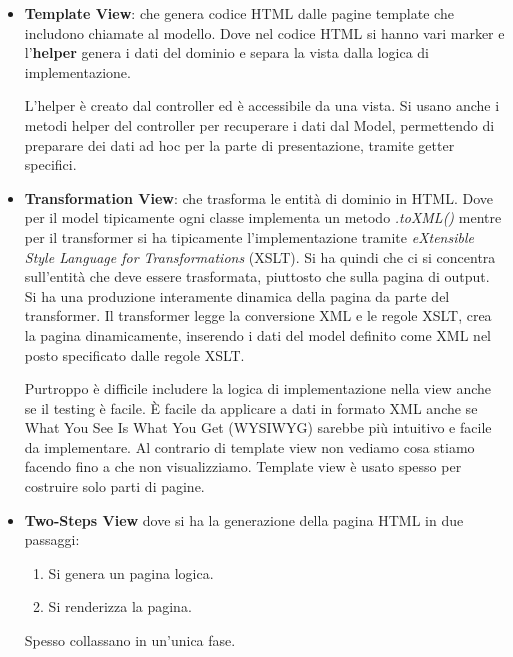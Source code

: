 \begin{itemize}
      \item \textbf{Template View}: che genera codice HTML dalle pagine template
            che includono chiamate al modello. Dove nel codice HTML si hanno vari
            marker e l'\textbf{helper} genera i dati del dominio e separa la vista
            dalla logica di implementazione.

            L'helper è creato dal controller ed è accessibile da una vista. Si
            usano anche i metodi helper del controller per recuperare i dati dal
            Model, permettendo di preparare dei dati ad hoc per la parte di
            presentazione, tramite getter specifici.
      \item \textbf{Transformation View}: che trasforma le entità di dominio in
            HTML. Dove per il model tipicamente ogni classe implementa un metodo
            \textit{.toXML()} mentre per il transformer si ha tipicamente
            l'implementazione tramite \textit{eXtensible Style Language for
                  Transformations} (XSLT). Si ha quindi che ci si concentra
            sull'entità che deve essere trasformata, piuttosto che sulla pagina
            di output. Si ha una produzione interamente dinamica della pagina da
            parte del transformer. Il transformer legge la conversione XML e le
            regole XSLT, crea la pagina dinamicamente, inserendo i dati del model
            definito come XML nel posto specificato dalle regole XSLT.

            Purtroppo è difficile includere la logica di implementazione nella
            view anche se il testing è facile. È facile da applicare a dati in
            formato XML anche se What You See Is What You Get (WYSIWYG) sarebbe
            più intuitivo e facile da implementare. Al contrario di template view
            non vediamo cosa stiamo facendo fino a che non visualizziamo.
            Template view è usato spesso per costruire solo parti di pagine.
      \item \textbf{Two-Steps View} dove si ha la generazione della pagina HTML
            in due passaggi:
            \begin{enumerate}
                  \item Si genera un pagina logica.
                  \item Si renderizza la pagina.
            \end{enumerate}
            Spesso collassano in un'unica fase.


\end{itemize}
